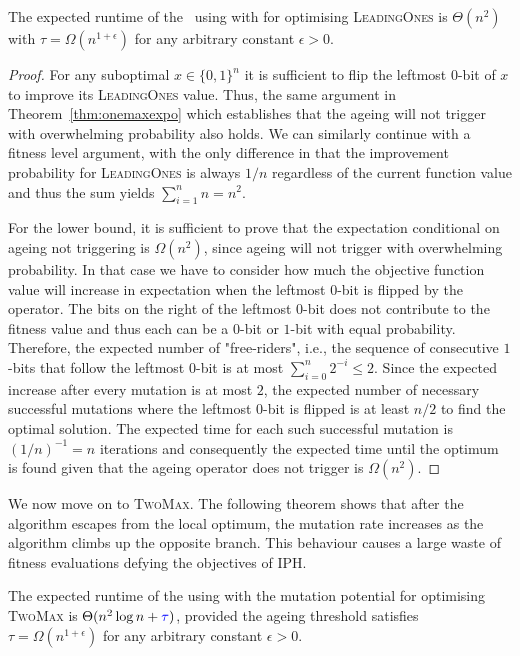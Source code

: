 \documentclass[lettersize,journal]{IEEEtran}
\begin{document}
\begin{theorem} \label{thm:leadingonesexpo}
The expected runtime of the \oneoneOPTIA~using \IPHfcm{}  with {\expoHD } for optimising
\textsc{LeadingOnes} is $\Theta(n^2)$ with $\tau=\Omega(n^{1+\epsilon})$ {\color{blue}for any arbitrary} 
constant $\epsilon>0$.
\end{theorem}
\begin{proof}
For any suboptimal $x\in\{0,1\}^n$ it is sufficient to flip the leftmost $0$-bit of $x$ to improve its \textsc{LeadingOnes} value. Thus, the same argument in Theorem~\ref{thm:onemaxexpo} which establishes that the ageing will not trigger with overwhelming probability also holds. We can similarly continue with a fitness level argument, {\color{blue} with the only difference in that} the improvement probability for \textsc{LeadingOnes} is always $1/n$ regardless of the current function value and thus the sum yields $\sum\limits_{i=1}^{n}n = n^2$.

For the lower bound, it is sufficient to prove that the {\color{blue}expectation conditional on ageing not triggering} is $\Omega(n^2)$, since ageing will not trigger with overwhelming probability. In that case we have to consider how much the objective function value will increase in expectation when the leftmost $0$-bit is flipped by the operator. The bits on the right of the leftmost $0$-bit does not contribute to the fitness value and thus each can be a $0$-bit or $1$-bit with equal probability. Therefore, the expected number of "free-riders", i.e., the sequence of consecutive $1$-bits that follow the leftmost $0$-bit is at most $\sum_{i=0}^{n}2^{-i}\leq 2$. Since the expected increase after every mutation is at most $2$, the expected number of necessary successful mutations where the leftmost $0$-bit is flipped is at least $n/2$ to find the optimal solution. The expected time for each such successful mutation is $(1/n)^{-1}=n$ iterations and consequently the expected time until the optimum is found given that the ageing operator does not trigger is $\Omega(n^2)$.  
\end{proof}
We now move on to \textsc{TwoMax}. The following theorem shows that after the algorithm escapes from the local optimum, the mutation rate increases as the algorithm climbs up the opposite branch.
This behaviour causes a large waste of fitness evaluations defying the objectives of IPH.
\begin{theorem}\label{thm:twomaxexpo}
	The expected runtime of the \oneoneOPTIA{} using \IPHfcm{} with
	the {\expoHD} mutation potential for optimising
	\textsc{TwoMax} is $\Theta(n^{2}\log n + {\color{blue}\tau})$, provided the ageing
	threshold satisfies $\tau=\Omega(n^{1+\epsilon})$  {\color{blue}for any arbitrary} constant
	$\epsilon>0$.
\end{theorem}
\end{document}
